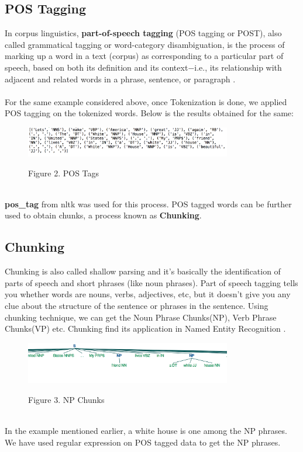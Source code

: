 \documentclass[fleqn,10pt]{SelfArx} %
\begin{document}
\subsection{POS Tagging}
In corpus linguistics, \textbf{part-of-speech tagging} (POS tagging or POST), also called grammatical tagging or word-category disambiguation, is the process of marking up a word in a text (corpus) as corresponding to a particular part of speech, based on both its definition and its context$-$i.e., its relationship with adjacent and related words in a phrase, sentence, or paragraph \cite{REF:3}.
\\\\For the same example considered above, once Tokenization is done, we applied POS tagging on the tokenized words. Below is the results obtained for the same: 
\begin{figure}[h]
\begin{minipage}[b]{1.0\linewidth}
  \centering
  \centerline{\includegraphics[width=9cm]{postags}}
  \centerline{Figure 2. POS  Tags}\medskip
\end{minipage}
\end{figure}
\\ \textbf{pos\_tag} from {nltk} was used for this process. POS tagged words can be further used to obtain chunks, a process known as \textbf{Chunking}.

\subsection{Chunking}
Chunking is also called shallow parsing and it's basically the identification of parts of speech and short phrases (like noun phrases). Part of speech tagging tells you whether words are nouns, verbs, adjectives, etc, but it doesn't give you any clue about the structure of the sentence or phrases in the sentence. Using chunking technique, we can get the Noun Phrase Chunks(NP), Verb Phrase Chunks(VP) etc. Chunking find its application in Named Entity Recognition \cite{REF:4}.
\begin{figure}[h]
\begin{minipage}[b]{1.0\linewidth}
  \centering
  \centerline{\includegraphics[width=9cm]{chunks}}
  \centerline{Figure 3. NP Chunks}\medskip
\end{minipage}
\end{figure}
\\In the example mentioned earlier, a white house is one among the NP phrases. We have used regular expression on POS tagged data to get the NP phrases.
\end{document}
